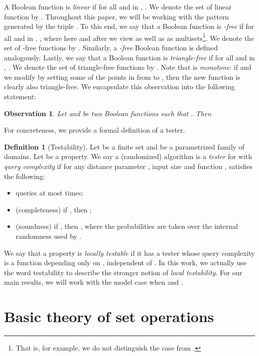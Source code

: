 \documentclass[11pt,english]{article}
\newtheorem{obs}{Observation}
\theoremstyle{definition}
\newtheorem{defn}{Definition}
\theoremstyle{remark}
\begin{document}
A Boolean function  is \emph{linear} if
for all  and  in , . We denote
the set of linear function by . Throughout this paper, we will
be working with the pattern generated by the triple .
To this end, we say that a Boolean function  is
\emph{-free} if for all  and  in , ,
where here and after we view  as well as 
as multisets\footnote{That is, for example, 
we do not distinguish the case 
from .}. 
We denote the set of -free functions by .
Similarly, a\emph{ -free} Boolean function is defined analogously.
Lastly, we say that a Boolean function  is \emph{triangle-free}
if for all  and  in , .
We denote the set of triangle-free functions by . Note that
 is \emph{monotone}: if  and we modify  by setting
some of the points in  from  to , then the new function
is clearly also triangle-free. 
We encapsulate this observation into the following statement:
\begin{obs}\label{obs:monotone}
Let  and  be two Boolean functions such that . 
Then 
\end{obs}

For concreteness, we provide a formal definition of a tester.

\begin{defn}[Testability] 
Let  be a finite set and 
 be a parametrized family of domains. 
Let  be a property. 
We say a (randomized) algorithm  is a \emph{tester} for 
with \emph{query complexity}  
if for any distance parameter , input size  
and function ,
 satisfies the following:

\begin{itemize}
\item  queries  at most  times;
\item (completeness) if , then ;
\item (soundness) if , 
then ,
where the probabilities are taken over the internal randomness used by .
\end{itemize}
\end{defn}

We say that a property is \emph{locally testable} 
if it has a tester whose query complexity is a function depending only on , 
independent of . 
In this work, we actually use the word testability to 
describe the stronger notion of \emph{local testability}. 
For our main results, we will work with the model case when 
 and . 


\section{\texorpdfstring{Basic theory of set operations}{3. Basic theory of set operations}}
\label{Sec:theory}
\end{document}
